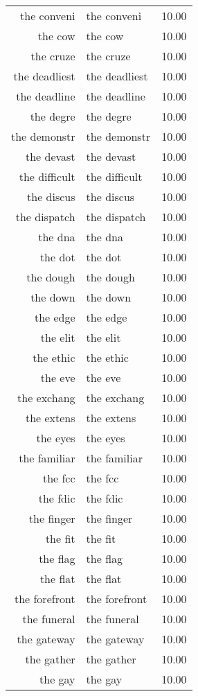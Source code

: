 \begin{table}[ht]
\begin{tabular}{rlr}
  the conveni & the conveni & 10.00 \\ 
  the cow & the cow & 10.00 \\ 
  the cruze & the cruze & 10.00 \\ 
  the deadliest & the deadliest & 10.00 \\ 
  the deadline & the deadline & 10.00 \\ 
  the degre & the degre & 10.00 \\ 
  the demonstr & the demonstr & 10.00 \\ 
  the devast & the devast & 10.00 \\ 
  the difficult & the difficult & 10.00 \\ 
  the discus & the discus & 10.00 \\ 
  the dispatch & the dispatch & 10.00 \\ 
  the dna & the dna & 10.00 \\ 
  the dot & the dot & 10.00 \\ 
  the dough & the dough & 10.00 \\ 
  the down & the down & 10.00 \\ 
  the edge & the edge & 10.00 \\ 
  the elit & the elit & 10.00 \\ 
  the ethic & the ethic & 10.00 \\ 
  the eve & the eve & 10.00 \\ 
  the exchang & the exchang & 10.00 \\ 
  the extens & the extens & 10.00 \\ 
  the eyes & the eyes & 10.00 \\ 
  the familiar & the familiar & 10.00 \\ 
  the fcc & the fcc & 10.00 \\ 
  the fdic & the fdic & 10.00 \\ 
  the finger & the finger & 10.00 \\ 
  the fit & the fit & 10.00 \\ 
  the flag & the flag & 10.00 \\ 
  the flat & the flat & 10.00 \\ 
  the forefront & the forefront & 10.00 \\ 
  the funeral & the funeral & 10.00 \\ 
  the gateway & the gateway & 10.00 \\ 
  the gather & the gather & 10.00 \\ 
  the gay & the gay & 10.00 \\ 

\end{tabular}
\end{table}
